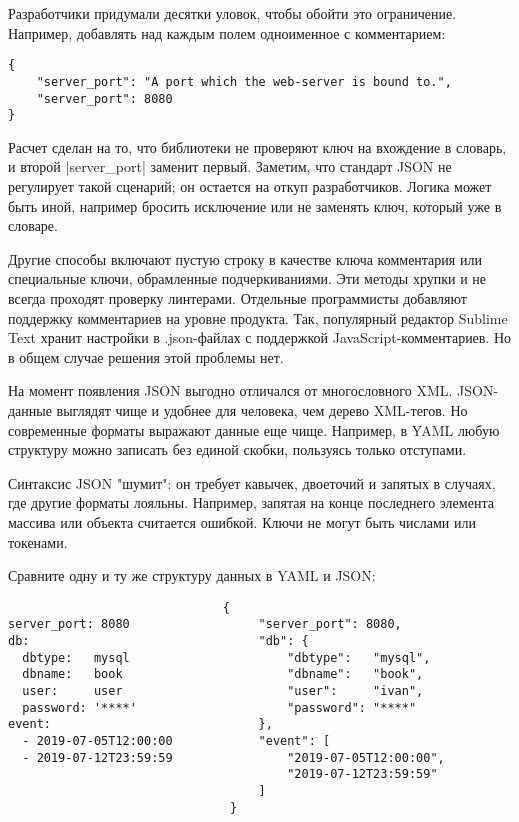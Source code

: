Разработчики придумали десятки уловок, чтобы обойти это ограничение. Например,
добавлять над каждым полем одноименное с комментарием:

\begin{verbatim}
{
    "server_port": "A port which the web-server is bound to.",
    "server_port": 8080
}
\end{verbatim}

Расчет сделан на то, что библиотеки не проверяют ключ на вхождение в словарь, и
второй \spverb|server_port| заменит первый. Заметим, что стандарт JSON не регулирует
такой сценарий; он остается на откуп разработчиков. Логика может быть иной,
например бросить исключение или не заменять ключ, который уже в словаре.

Другие способы включают пустую строку в качестве ключа комментария или
специальные ключи, обрамленные подчеркиваниями. Эти методы хрупки и не всегда
проходят проверку линтерами. Отдельные программисты добавляют поддержку
комментариев на уровне продукта. Так, популярный редактор Sublime Text хранит
настройки в .json-файлах с поддержкой JavaScript-комментариев. Но в общем случае
решения этой проблемы нет.

На момент появления JSON выгодно отличался от многословного XML. JSON-данные
выглядят чище и удобнее для человека, чем дерево XML-тегов. Но современные
форматы выражают данные еще чище. Например, в YAML любую структуру можно
записать без единой скобки, пользуясь только отступами.

Синтаксис JSON "шумит": он требует кавычек, двоеточий и запятых в случаях, где
другие форматы лояльны. Например, запятая на конце последнего элемента массива
или объекта считается ошибкой. Ключи не могут быть числами или
токенами.

Сравните одну и ту же структуру данных в YAML и JSON:

\begin{verbatim}
                              {
server_port: 8080                  "server_port": 8080,
db:                                "db": {
  dbtype:   mysql                      "dbtype":   "mysql",
  dbname:   book                       "dbname":   "book",
  user:     user                       "user":     "ivan",
  password: '****'                     "password": "****"
event:                             },
  - 2019-07-05T12:00:00            "event": [
  - 2019-07-12T23:59:59                "2019-07-05T12:00:00",
                                       "2019-07-12T23:59:59"
                                   ]
                               }
\end{verbatim}


